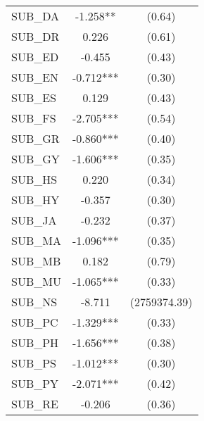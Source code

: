 \begin{table}[H]
\begin{threeparttable}
\begin{tabular}{l c c}
      SUB\_DA                               & -1.258**               & (0.64)               \\
      SUB\_DR                               & 0.226                  & (0.61)               \\
      SUB\_ED                               & -0.455                 & (0.43)               \\
      SUB\_EN                               & -0.712***              & (0.30)               \\
      SUB\_ES                               & 0.129                  & (0.43)               \\
      SUB\_FS                               & -2.705***              & (0.54)               \\
      SUB\_GR                               & -0.860***              & (0.40)               \\
      SUB\_GY                               & -1.606***              & (0.35)               \\
      SUB\_HS                               & 0.220                  & (0.34)               \\
      SUB\_HY                               & -0.357                 & (0.30)               \\
      SUB\_JA                               & -0.232                 & (0.37)               \\
      SUB\_MA                               & -1.096***              & (0.35)               \\
      SUB\_MB                               & 0.182                  & (0.79)               \\
      SUB\_MU                               & -1.065***              & (0.33)               \\
      SUB\_NS                               & -8.711                 & (2759374.39)         \\
      SUB\_PC                               & -1.329***              & (0.33)               \\
      SUB\_PH                               & -1.656***              & (0.38)               \\
      SUB\_PS                               & -1.012***              & (0.30)               \\
      SUB\_PY                               & -2.071***              & (0.42)               \\
      SUB\_RE                               & -0.206                 & (0.36)               \\

\end{tabular}
\end{threeparttable}
\end{table}
